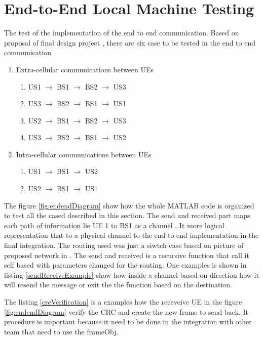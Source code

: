 \section{End-to-End Local Machine Testing }
The test of the implementation of the end to end communication.
Based on proposal of final design project \cite{cdproj}, there
are six case to be tested in the end to end communication
\begin{enumerate}
  \item Extra-cellular communications between UEs
  \begin{enumerate}
    \item US1 $\rightarrow$ BS1 $\rightarrow$ BS2 $\rightarrow$ US3
    \item US3 $\rightarrow$ BS2 $\rightarrow$ BS1 $\rightarrow$ US1
		\item US2 $\rightarrow$ BS1 $\rightarrow$ BS2 $\rightarrow$ US3
		\item US3 $\rightarrow$ BS2 $\rightarrow$ BS1 $\rightarrow$ US2
  \end{enumerate}
  \item Intra-cellular communications between UEs
	  \begin{enumerate}
    \item US1 $\rightarrow$ BS1 $\rightarrow$ US2
    \item US2 $\rightarrow$ BS1 $\rightarrow$ US1
	\end{enumerate}
\end{enumerate}

The figure \ref{fig:endendDiagram} show how the whole MATLAB code is organized to test all the cased described in this section.
The send and received part maps each path of information lie UE 1 to BS1 as a channel . It more logical representation that to a physical channel to the end
to end implementation in the final integration.
The routing used was just a siwtch case based on picture of proposed network in \cite{cdproj}.
The send and received is a recursive function that call it self based with parameters changed for the routing.
One examples is shown in listing \ref{sendReceiveExample} show how inside a channel based on direction how it will resend the message or exit the the function based on the destination.


The listing \ref{crcVerification} is a examples how the receveive UE in the figure \ref{fig:endendDiagram} verify the CRC and create the new frame to send back.
It procedure is important because it need to be done in the integration with other team that need to use the frameObj.     

